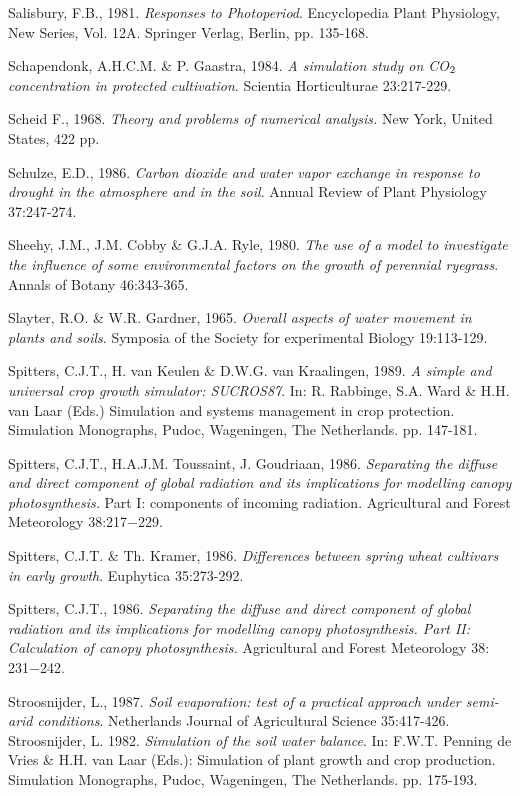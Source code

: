 Salisbury, F.B., 1981. {\it Responses to Photoperiod\/}. Encyclopedia Plant Physiology, New Series, Vol.
12A. Springer Verlag, Berlin, pp. 135-168.

Schapendonk, A.H.C.M. \& P. Gaastra, 1984. {\it A simulation study on CO$_{{\rm 2}}$ concentration in protected
cultivation\/}. Scientia Horticulturae 23:217-229.

Scheid F., 1968. {\it Theory and problems of numerical analysis.\/} New York, United States, 422 pp.

Schulze, E.D., 1986. {\it Carbon dioxide and water vapor exchange in response to drought in the
atmosphere and in the soil\/}. Annual Review of Plant Physiology 37:247-274.

Sheehy, J.M., J.M. Cobby \& G.J.A. Ryle, 1980. {\it The use of a model to investigate the influence of
some environmental factors on the growth of perennial ryegrass\/}. Annals of Botany 46:343-365.

Slayter, R.O. \& W.R. Gardner, 1965. {\it Overall aspects of water movement in plants and soils\/}.
Symposia of the Society for experimental Biology 19:113-129.

Spitters, C.J.T., H. van Keulen \& D.W.G. van Kraalingen, 1989. {\it A simple and universal crop
growth simulator: SUCROS87\/}. In: R. Rabbinge, S.A. Ward \& H.H. van Laar (Eds.) Simulation and
systems management in crop protection. Simulation Monographs, Pudoc, Wageningen, The
Netherlands. pp. 147-181.

Spitters, C.J.T., H.A.J.M. Toussaint, J. Goudriaan, 1986. {\it Separating the diffuse and direct
component of global radiation and its implications for modelling canopy photosynthesis.\/} Part I:
components of incoming radiation. Agricultural and Forest Meteorology 38:217$-$229. 

Spitters, C.J.T. \& Th. Kramer, 1986. {\it Differences between spring wheat cultivars in early growth\/}.
Euphytica 35:273-292.

Spitters, C.J.T., 1986. {\it Separating the diffuse and direct component of global radiation and its
implications for modelling canopy photosynthesis. Part II: Calculation of canopy photosynthesis.\/}
Agricultural and Forest Meteorology 38: 231$-$242. 

Stroosnijder, L., 1987. {\it Soil evaporation: test of a practical approach under semi-arid conditions\/}.
Netherlands Journal of Agricultural Science 35:417-426.\\
 Stroosnijder, L. 1982. {\it Simulation of the soil water balance\/}. In: F.W.T. Penning de Vries \& H.H.
van Laar (Eds.): Simulation of plant growth and crop production. Simulation Monographs, Pudoc,
Wageningen, The Netherlands. pp. 175-193.

